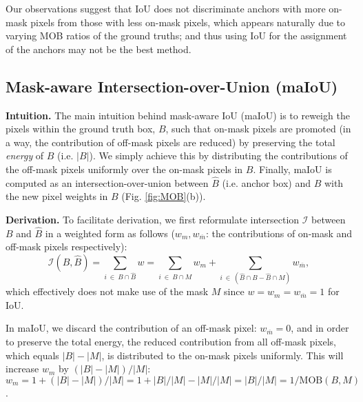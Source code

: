 \documentclass{bmvc2k}
\begin{document}
Our observations suggest that IoU does not discriminate anchors with more on-mask pixels from those with less on-mask pixels, which appears naturally due to varying MOB ratios of the ground truths; and thus using IoU for the assignment of the anchors may not be the best method. 





\subsection{Mask-aware Intersection-over-Union (maIoU)}
\label{subsec:maIoU}
\noindent \textbf{Intuition.} The main intuition behind mask-aware IoU (maIoU) is to reweigh the pixels within the ground truth box, $B$, such that on-mask pixels are promoted (in a way, the contribution of off-mask pixels are reduced) by preserving the total \textit{energy} of $B$ (i.e. $|B|$). We simply achieve this by distributing the contributions of the off-mask pixels uniformly over the on-mask pixels in $B$. Finally, maIoU is computed as an intersection-over-union between $\hat{B}$ (i.e. anchor box) and $B$ with the new pixel weights in $B$ (Fig. \ref{fig:MOB}(b)).

\noindent \textbf{Derivation.} To facilitate derivation, we first reformulate intersection $\mathcal{I}$ between $B$ and $\hat{B}$ in a weighted form as follows ($w_m, w_{\overline{m}}$: the contributions of on-mask and off-mask pixels respectively):
\begin{equation}
\mathcal{I}(B, \hat{B}) = \sum_{i\ \in\ B \cap \hat{B}} w = \sum_{i\ \in\ \hat{B} \cap M} w_m +  \sum_{i\ \in\ \left(\hat{B} \cap B - \hat{B} \cap M \right )} w_{\overline{m}}, \label{eqn:IoU}
\end{equation}
which effectively does not make use of the mask $M$ since $w=w_m=w_{\overline{m}}=1$ for IoU. 

In maIoU, we discard the contribution of an off-mask pixel: $w_{\overline{m}}=0$, and in order to preserve the total energy, the reduced contribution from all off-mask pixels, which equals $|B|-|M|$, is distributed to the on-mask pixels uniformly. This will increase $w_m$ by $(|B|-|M|)/|M|$: $w_m=1+(|B|-|M|)/|M|=1+|B|/|M|-|M|/|M|=|B|/|M|=1/\mathrm{MOB}(B,M)$. 
\end{document}
